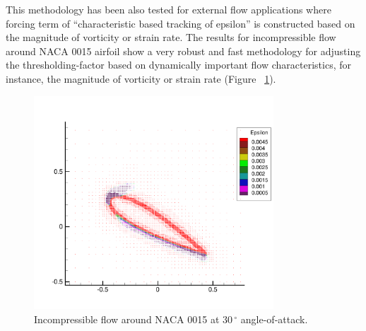 This methodology has been also tested for external flow applications where forcing term of ``characteristic based tracking of epsilon'' is
constructed based on the magnitude of vorticity or strain rate.
The results for incompressible flow around NACA 0015 airfoil show a
very robust and fast methodology for adjusting the thresholding-factor based on dynamically
important flow characteristics, for instance, the magnitude of vorticity or strain rate (Figure ~\ref{fig:NACA0015}).

\begin{figure}[htp]
  \vspace{-20pt}
\begin{center}
  \includegraphics[width=0.8\textwidth]{figures/NACA0015.pdf}
\end{center}
  \vspace{-30pt}
  \caption{Incompressible flow around NACA 0015 at $30\,^{\circ}$ angle-of-attack.}
  \label{fig:NACA0015}
\end{figure}


